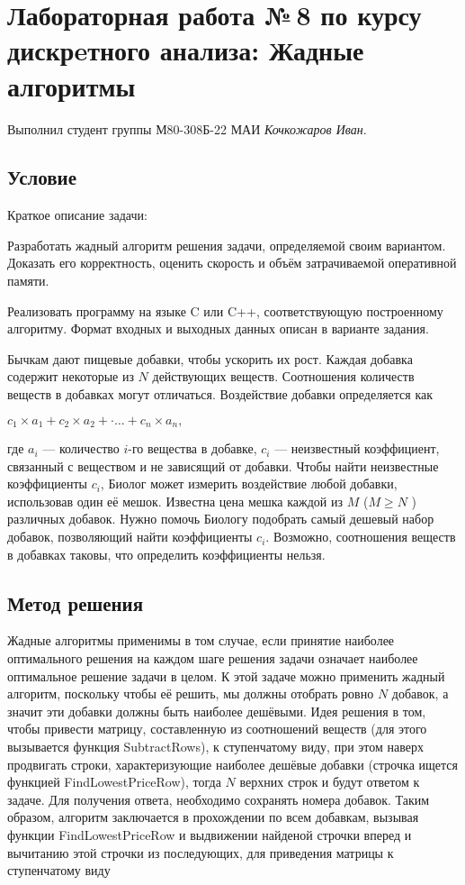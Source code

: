 \documentclass[12pt]{article}
\begin{document}
\section*{Лабораторная работа №\,8 по курсу дискрeтного анализа: Жадные алгоритмы}

Выполнил студент группы М80-308Б-22 МАИ \textit{Кочкожаров Иван}.

\subsection*{Условие}

Краткое описание задачи:

Разработать жадный алгоритм решения задачи, определяемой своим
вариантом. Доказать его корректность, оценить скорость и объём
затрачиваемой оперативной памяти.

Реализовать программу на языке C или C++, соответствующую
построенному алгоритму. Формат входных и выходных данных описан в
варианте задания.

Бычкам дают пищевые добавки, чтобы ускорить их рост. Каждая добавка
содержит некоторые из $N$ действующих веществ. Соотношения количеств веществ в добавках могут отличаться. Воздействие добавки
определяется как

$c_1\times a_1 + c_2 \times a_2 +·\ldots +c_n \times a_n,$

где $a_i$ — количество $i$-го вещества в добавке, $c_i$ — неизвестный
коэффициент, связанный с веществом и не зависящий от добавки. Чтобы
найти неизвестные коэффициенты $c_i$, Биолог может измерить
воздействие любой добавки, использовав один её мешок. Известна цена
мешка каждой из $M$ ($M \geq N$ ) различных добавок. Нужно помочь Биологу
подобрать самый дешевый набор добавок, позволяющий найти
коэффициенты $c_i$. Возможно, соотношения веществ в добавках таковы,
что определить коэффициенты нельзя.

\subsection*{Метод решения}

Жадные алгоритмы применимы в том случае, если принятие наиболее 
оптимального решения на каждом шаге решения задачи означает наиболее 
оптимальное решение задачи в целом. К этой задаче можно применить жадный 
алгоритм, поскольку чтобы её решить, мы должны отобрать ровно $N$ добавок, 
а значит эти добавки должны быть наиболее дешёвыми. Идея решения в том, 
чтобы привести матрицу, составленную из соотношений веществ (для этого вызывается функция SubtractRows), к ступенчатому 
виду, при этом наверх продвигать строки, характеризующие наиболее дешёвые 
добавки (строчка ищется функцией FindLowestPriceRow), тогда $N$ верхних строк и будут ответом к задаче. Для получения 
ответа, необходимо сохранять номера добавок. Таким образом, алгоритм заключается в прохождении по всем добавкам,
вызывая функции FindLowestPriceRow и выдвижении найденой строчки вперед и вычитанию этой строчки из последующих, для приведения матрицы к ступенчатому виду
\end{document}
